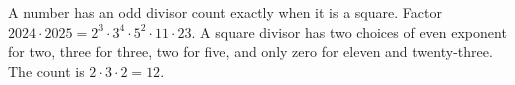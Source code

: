 A number has an odd divisor count exactly when it is a square. Factor $2024\cdot2025=2^3\cdot3^4\cdot5^2\cdot11\cdot23$. A square divisor has two choices of even exponent for two, three for three, two for five, and only zero for eleven and twenty-three. The count is $\boxed{2\cdot3\cdot2=12}$.
